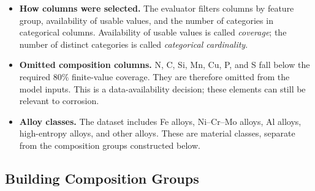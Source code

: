 \documentclass[11pt]{article}
\newenvironment{notes}
  {\begin{itemize}\setlength{\itemsep}{0.45em}\setlength{\parsep}{0pt}}
  {\end{itemize}}
\begin{document}
\begin{notes}
    \item \textbf{How columns were selected.} The evaluator filters
    columns by feature group, availability of usable values, and the
    number of categories in categorical columns. Availability of usable
    values is called \emph{coverage}; the number of distinct categories
    is called \emph{categorical cardinality}.

    \item \textbf{Omitted composition columns.} N, C, Si, Mn, Cu, P,
    and S fall below the required \(80\%\) finite-value coverage.
    They are therefore omitted from the model inputs. This is a
    data-availability decision; these elements can still be relevant
    to corrosion.

    \item \textbf{Alloy classes.} The dataset includes Fe alloys,
    Ni--Cr--Mo alloys, Al alloys, high-entropy alloys, and other alloys.
    These are material classes, separate from the composition groups
    constructed below.
\end{notes}

\subsection{Building Composition Groups}
\label{sec:composition-groups}
\end{document}
